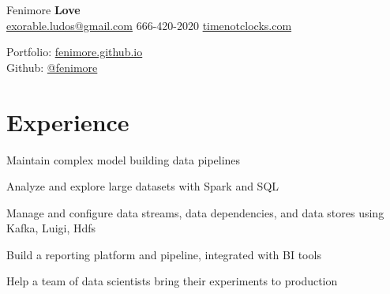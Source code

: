 \documentclass[]{deedy-resume-openfont}
\begin{document}
%
%

%
%
\hspace{-5.5mm}
\begin{minipage}[t]{.6\textwidth}
{\Huge Fenimore {\textbf{Love}}}\\
\href{mailto:exorable.ludos@gmail.com}{exorable.ludos@gmail.com} \textbullet{} 666-420-2020 \textbullet{} \href{https://timenotclocks.com}{timenotclocks.com}\\
\end{minipage}
\hfill
\begin{minipage}[t]{.3\textwidth}
Portfolio: \href{https://fenimore.github.io}{fenimore.github.io}\\
Github: \href{https://github.com/fenimore}{@fenimore}
\end{minipage}
\namesection{}{} %


\section{Experience}
\vspace{\topsep} %
\vspace{\topsep} %
\begin{tightemize}
\item Maintain complex model building data pipelines
\item Analyze and explore large datasets with Spark and SQL
\item Manage and configure data streams, data dependencies, and data stores using Kafka, Luigi, Hdfs
\item Build a reporting platform and pipeline, integrated with BI tools
\item Help a team of data scientists bring their experiments to production
\end{tightemize}
\sectionsep
\end{document}
